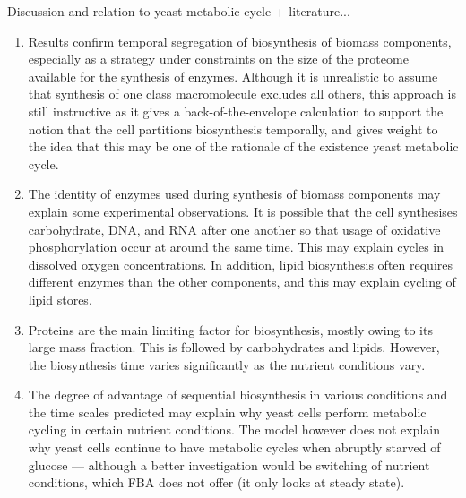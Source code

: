 Discussion and relation to yeast metabolic cycle + literature...
\begin{enumerate}
  \item Results confirm temporal segregation of biosynthesis of biomass components, especially as a strategy under constraints on the size of the proteome available for the synthesis of enzymes.
        Although it is unrealistic to assume that synthesis of one class macromolecule excludes all others, this approach is still instructive as it gives a back-of-the-envelope calculation to support the notion that the cell partitions biosynthesis temporally, and gives weight to the idea that this may be one of the rationale of the existence yeast metabolic cycle.
  \item The identity of enzymes used during synthesis of biomass components may explain some experimental observations.
        It is possible that the cell synthesises carbohydrate, DNA, and RNA after one another so that usage of  oxidative phosphorylation occur at around the same time.
        This may explain cycles in dissolved oxygen concentrations.
        In addition, lipid biosynthesis often requires different enzymes than the other components, and this may explain cycling of lipid stores.
  \item Proteins are the main limiting factor for biosynthesis, mostly owing to its large mass fraction.
        This is followed by carbohydrates and lipids.
        However, the biosynthesis time varies significantly as the nutrient conditions vary.
  \item The degree of advantage of sequential biosynthesis in various conditions and the time scales predicted may explain why yeast cells perform metabolic cycling in certain nutrient conditions.
        The model however does not explain why yeast cells continue to have metabolic cycles when abruptly starved of glucose --- although a better investigation would be switching of nutrient conditions, which FBA does not offer (it only looks at steady state).

\end{enumerate}

